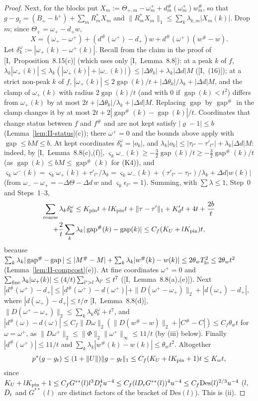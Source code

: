 \documentclass[10pt]{amsart}
\theoremstyle{definition}
\theoremstyle{remark}
\newcommand{\gap}{\operatorname{gap}}
\begin{document}
\begin{proof}
Next, for the blocks put $X_m:=\Theta_{+,m}-\omega^+_m+d^\#_m(\omega^+_m)
w^\#_m$, so that $g-g_t=(B_+-b^+)+\sum_mR_m^*X_m$ and $\|R_m^*X_m\|_1\le
\sum_k\lambda_{k,m}|X_m(k)|$.  Drop $m$; since $\Theta_+=\omega_+-d_+w$,
\[
 X=(\omega_+-\omega^+)+(d^\#(\omega^+)-d_+)w+d^\#(\omega^+)(w^\#-w).
\]
Let $\delta^\omega_k:=|\omega_+(k)-\omega^+(k)|$.  Recall from the claim in the
proof of [I,~Proposition~8.15(c)] (which uses only [I,~Lemma~8.8]):
at a peak $k$ of $f$, $\lambda_k|\omega_+(k)|\le\lambda_k(|\omega_+(k)|+
|\omega_-(k)|)\le|\Delta\theta_k|+\lambda_k|\Delta d|M$
([I,~(16)]); at a strict non-peak $k$ of $f$, $|\omega_+(k)|\le2\gap(k)/t+
|\Delta\theta_k|/\lambda_k+|\Delta d|M$, and the clamp of $\omega_+(k)$ with
radius $2\gap(k)/t$ (and with $0$ if $\gap(k)<t^2$) differs from
$\omega_+(k)$ by at most $2t+|\Delta\theta_k|/\lambda_k+|\Delta d|M$.
Replacing $\gap$ by $\gap^\#$ in the clamp changes it by at most $2t+2|\gap^\#(k)
-\gap(k)|/t$.  Coordinates that change status between $f$ and $f^\#$ and are
not kept satisfy $|\varrho-1|\le b$ (Lemma~\ref{lem:II-status}(c)); there
$\omega^+=0$ and the bounds above apply with $\gap\le bM\le b$.  At kept
coordinates $\delta^\omega_k=|o_k|$, and $\lambda_k|o_k|\le|\tau_{l''}-
\tau'_{l''}|+\lambda_k|\Delta d|M$: indeed, by [I,~Lemma~8.8(c),(f)],
$\varsigma_k\omega_-(k)\ge-\frac32\gap(k)/t\ge-\frac32\gap^\#(k)/t$ (as
$\gap(k)\le bM\le\gap^\#(k)$ for (K4)), and $\varsigma_k\omega^-(k)=
\varsigma_k\omega_+(k)+\tau'_{l''}/\lambda_k=\varsigma_k\omega_-(k)+(\tau'_{l''}-
\tau_{l''})/\lambda_k+\Delta d|w(k)|$ (from $\omega_--\omega_+=-\Delta\Theta-
\Delta d\,w$ and $\varsigma_k\epsilon_{l''}=1$).  Summing, with
$\sum\lambda\le1$, Step~0 and Steps~1--3,
\begin{multline*}
 \sum_{\rm coarse}\lambda_k\delta^\omega_k\le K_{\rm pin}t+lK_{\rm pin}t+
 \|\tau-\tau'\|_1+K'_dt+4t+\frac{2b}t\\
 +\frac2t\sum_k\lambda_k|\gap^\#(k)-\gap(k)|\le C_f(K_U+lK_{\rm pin})t,
\end{multline*}
because $\sum_k\lambda_k|\gap^\#-\gap|\le|M^\#-M|+\sum_k\lambda_k|w^\#(k)-w(k)|
\le2\theta_wT_{\rm lo}^2\le2\theta_wt^2$ (Lemma~\ref{lem:II-compcost}(e)).
At fine coordinates $\omega^+=0$ and $\sum_{\rm fine}\lambda_k|\omega_+(k)|
\le(4/t)\sum_{l'>l}\lambda_{l'}\le t^7$ ([I,~Lemma~8.8(a),(e)]).  Next
$|d^\#(\omega^+)-d_+|\le|d^\#(\omega^+)-d(\omega^+)|+\|D(\omega^+-\omega_+)
\|_2+|d(\omega_+)-d_+|$, where $|d(\omega_+)-d_+|\le t/\sigma$
[I,~Lemma~8.8(d)], $\|D(\omega^+-\omega_+)\|_2\le\sum_k\lambda_k\delta^\omega_k+t^7$,
and $|d^\#(\omega)-d(\omega)|\le C_f\|D\omega\|_2(\|D(w^\#-w)\|_2+|C^\#-C|)\le
C_f\theta_wt$ for $\omega=\omega^+$, as $\|D\omega^+\|_2\le\|\Phi\|_2
\|\omega^+\|_\infty\le11/t$ (by (iii) below).  Finally $|d^\#(\omega^+)|\le11/t$
and $\sum_k\lambda_k|w^\#(k)-w(k)|\le\theta_wt^2$.  Altogether
\[
 p^*(g-g_t)\le(1+\|U\|)\|g-g_t\|_1\le C_f(K_U+lK_{\rm pin}+1)t\le K_wt,
\]
since $K_U+lK_{\rm pin}+1\le C_fG^{**}(l)l^3D_{\rm r}^4u^{-4}\le C_f
(lD_{\rm r}G^{**}(l))^4u^{-4}\le C_f\mathrm{Des}(l)^{2/3}u^{-4}$ ($l$,
$D_{\rm r}$ and $G^{**}(l)$ are distinct factors of the bracket of
$\mathrm{Des}(l)$).  This is (ii).


\end{proof}
\end{document}
